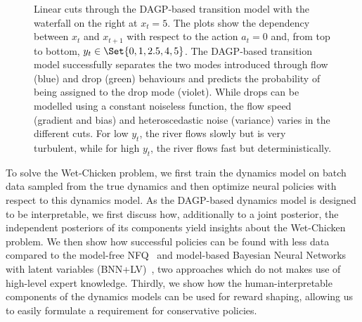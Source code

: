 \begin{figure}[tp]
    \centering
    
    
    
    
    
    \caption{
        \label{fig:interpretable_reinforcement_learning:wetchicken:cut}
        Linear cuts through the DAGP-based transition model with the waterfall on the right at $x_t = 5$.
        The plots show the dependency between $x_t$ and $x_{t+1}$ with respect to the action $a_t = 0$ and, from top to bottom, $y_t \in \Set{0, 1, 2.5, 4, 5}$.
        The DAGP-based transition model successfully separates the two modes introduced through flow (blue) and drop (green) behaviours and predicts the probability of being assigned to the drop mode (violet).
        While drops can be modelled using a constant noiseless function, the flow speed (gradient and bias) and heteroscedastic noise (variance) varies in the different cuts.
        For low $y_t$, the river flows slowly but is very turbulent, while for high $y_t$, the river flows fast but deterministically.
    }
\end{figure}
To solve the Wet-Chicken problem, we first train the dynamics model on batch data sampled from the true dynamics and then optimize neural policies with respect to this dynamics model.
As the DAGP-based dynamics model is designed to be interpretable, we first discuss how, additionally to a joint posterior, the independent posteriors of its components yield insights about the Wet-Chicken problem.
We then show how successful policies can be found with less data compared to the model-free NFQ~\parencite{riedmiller_neural_2005} and model-based Bayesian Neural Networks with latent variables (BNN+LV)~\parencite{depeweg_learning_2016}, two approaches which do not makes use of high-level expert knowledge.
Thirdly, we show how the human-interpretable components of the dynamics models can be used for reward shaping, allowing us to easily formulate a requirement for conservative policies.


